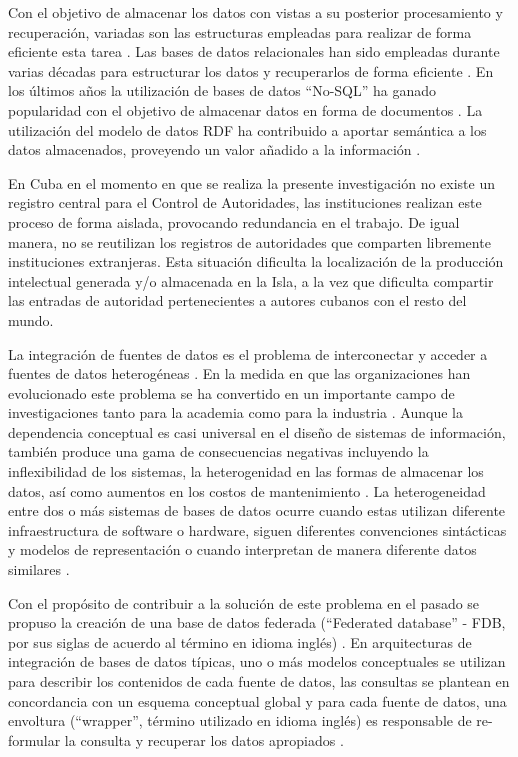 Con el objetivo de almacenar los datos con vistas a su posterior procesamiento y recuperación, variadas son las estructuras empleadas para realizar de forma eficiente esta tarea \citep{Gutierrez2011,Vavliakis2013,Lacasta2013}. Las bases de datos relacionales han sido empleadas durante varias décadas para estructurar los datos y recuperarlos de forma eficiente \citep{maier1983theory,Shanmugasundaram1999,Ilyas2004,Spanos2012}. En los últimos años la utilización de bases de datos ``No-SQL'' ha ganado popularidad con el objetivo de almacenar datos en forma de documentos \citep{Pokorny2013,Moniruzzaman2013}. La utilización del modelo de datos RDF ha contribuido a aportar semántica a los datos almacenados, proveyendo un valor añadido a la información \citep{Berners-Lee2001,Konstantinou2014,Sule2016}.

En Cuba en el momento en que se realiza la presente investigación no existe un registro central para el Control de Autoridades, las instituciones realizan este proceso de forma aislada, provocando redundancia en el trabajo. De igual manera, no se reutilizan los registros de autoridades que comparten libremente instituciones extranjeras. Esta situación dificulta la localización de la producción intelectual generada y/o almacenada en la Isla, a la vez que dificulta compartir las entradas de autoridad pertenecientes a autores cubanos con el resto del mundo.

La integración de fuentes de datos es el problema de interconectar y acceder a fuentes de datos heterogéneas \citep{Nachouki2011}. En la medida en que las organizaciones han evolucionado este problema se ha convertido en un importante campo de investigaciones tanto para la academia como para la industria \citep{Nachouki2011}. Aunque la dependencia conceptual es casi universal en el diseño de sistemas de información, también produce una gama de consecuencias negativas incluyendo la inflexibilidad de los sistemas, la heterogenidad en las formas de almacenar los datos, así como aumentos en los costos de mantenimiento \citep{McGinnes2015}. La heterogeneidad entre dos o más sistemas de bases de datos ocurre cuando estas utilizan diferente infraestructura de software o hardware, siguen diferentes convenciones sintácticas y modelos de representación o cuando interpretan de manera diferente datos similares \citep{Spanos2012}.

Con el propósito de contribuir a la solución de este problema en el pasado se propuso la creación de una base de datos federada (``Federated database'' - FDB, por sus siglas de acuerdo al término en idioma inglés) \citep{Sheth1990}. En arquitecturas de integración de bases de datos típicas, uno o más modelos conceptuales se utilizan para describir los contenidos de cada fuente de datos, las consultas se plantean en concordancia con un esquema conceptual global y para cada fuente de datos, una envoltura (``wrapper'', término utilizado en idioma inglés) es responsable de re-formular la consulta y recuperar los datos apropiados \citep{Spanos2012,Franke2014,ElKadiri2015}.

